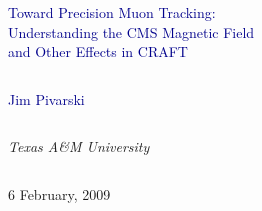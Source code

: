 \documentclass[compress]{beamer}
\begin{document}
\begin{frame}
\vfill
\begin{center}
\textcolor{darkblue}{\LARGE Toward Precision Muon Tracking: \\ \Large \vspace{0.2 cm} Understanding the CMS Magnetic Field \\ \vspace{0.2 cm} and Other Effects in CRAFT}

\vfill
\begin{columns}
\begin{center}
\large
\textcolor{darkblue}{Jim Pivarski}
\end{center}
\end{columns}

\begin{columns}
\begin{center}
\scriptsize
{\it Texas A\&M University}
\end{center}
\end{columns}

\vfill
 6 February, 2009

\end{center}
\end{frame}


\small
\end{document}

